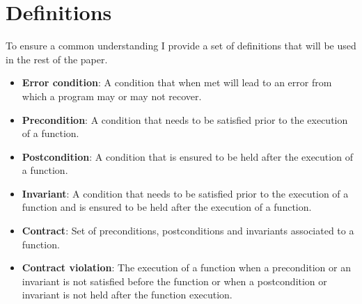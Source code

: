 \section{Definitions}

To ensure a common understanding I provide a set of definitions that will be
used in the rest of the paper.

\begin{itemize}

\item \textbf{Error condition}: A condition that when met will lead to an error
from which a program may or may not recover.

\item \textbf{Precondition}: A condition that needs to be satisfied prior to
the execution of a function.

\item \textbf{Postcondition}: A condition that is ensured to be held after the
execution of a function.

\item \textbf{Invariant}: A condition that needs to be satisfied prior to the
execution of a function and is ensured to be held after the execution of a
function.

\item \textbf{Contract}: Set of preconditions, postconditions and invariants
associated to a function.

\item \textbf{Contract violation}: The execution of a function when a
precondition or an invariant is not satisfied before the function or when a
postcondition or invariant is not held after the function execution.

\end{itemize}
